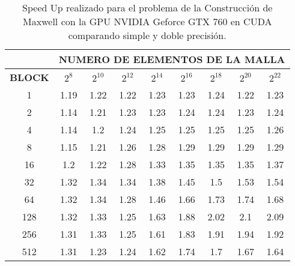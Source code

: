 \begin{table}[h!]
\centering
    \begin{tabular}{|c|c|c|c|c|c|c|c|c|}
    \hline
                   & \multicolumn{8}{c|}{\textbf{NUMERO DE ELEMENTOS DE LA MALLA}} \\ \hline
    \textbf{BLOCK} & $2^{8}$ & $2^{10}$& $2^{12}$& $2^{14}$& $2^{16}$& $2^{18}$& $2^{20}$& $2^{22}$\\ \hline
    1              & 1.19  & 1.22  & 1.22  & 1.23  & 1.23  & 1.24  & 1.22  & 1.23  \\ \hline
    2              & 1.14  & 1.21  & 1.23  & 1.23  & 1.24  & 1.24  & 1.23  & 1.24  \\ \hline
    4              & 1.14  & 1.2   & 1.24  & 1.25  & 1.25  & 1.25  & 1.25  & 1.26  \\ \hline
    8              & 1.15  & 1.21  & 1.26  & 1.28  & 1.29  & 1.29  & 1.29  & 1.29  \\ \hline
    16             & 1.2   & 1.22  & 1.28  & 1.33  & 1.35  & 1.35  & 1.35  & 1.37  \\ \hline
    32             & 1.32  & 1.34  & 1.34  & 1.38  & 1.45  & 1.5   & 1.53  & 1.54  \\ \hline
    64             & 1.32  & 1.34  & 1.28  & 1.46  & 1.66  & 1.73  & 1.74  & 1.68  \\ \hline
    128            & 1.32  & 1.33  & 1.25  & 1.63  & 1.88  & 2.02  & 2.1   & 2.09  \\ \hline
    256            & 1.31  & 1.33  & 1.25  & 1.61  & 1.83  & 1.91  & 1.94  & 1.92  \\ \hline
    512            & 1.31  & 1.23  & 1.24  & 1.62  & 1.74  & 1.7   & 1.67  & 1.64  \\ \hline
    \end{tabular}
    \caption{Speed Up realizado para el problema de la Construcción de Maxwell con la GPU NVIDIA Geforce GTX 760 en CUDA comparando simple y doble precisión.}
    \label{tab:c_760_MxC_cuda_10}
    \end{table}

